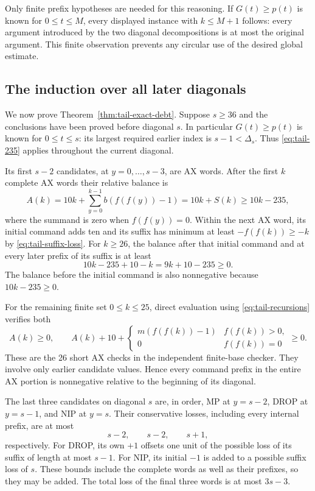 Only finite prefix hypotheses are needed for this reasoning. If
$G(t)\geq p(t)$ is known for $0\leq t\leq M$, every displayed instance
with $k\leq M+1$ follows: every argument introduced by the two diagonal
decompositions is at most the original argument. This finite observation
prevents any circular use of the desired global estimate.

\subsection{The induction over all later diagonals}

We now prove Theorem~\ref{thm:tail-exact-debt}. Suppose $s\geq36$ and
the conclusions have been proved before diagonal $s$.
In particular $G(t)\geq p(t)$ is known for $0\leq t\leq s$:
its largest required earlier index is $s-1<\Delta_s$.
Thus \eqref{eq:tail-235} applies throughout the current diagonal.

Its first $s-2$ candidates, at $y=0,\ldots,s-3$, are AX words.
After the first $k$ complete AX words their relative balance is
\begin{equation}
 A(k)=10k+\sum_{y=0}^{k-1}b(f(f(y))-1)
     =10k+S(k)\geq10k-235,
 \label{eq:tail-AX-complete}
\end{equation}
where the summand is zero when $f(f(y))=0$.
Within the next AX word, its initial command adds ten and its suffix
has minimum at least $-f(f(k))\geq-k$ by
\eqref{eq:tail-suffix-loss}. For $k\geq26$, the balance after that
initial command and at every later prefix of its suffix is at least
\[
 10k-235+10-k=9k+10-235\geq0.
\]
The balance before the initial command is also nonnegative because
$10k-235\geq0$.

For the remaining finite set $0\leq k\leq25$, direct evaluation using
\eqref{eq:tail-recursions} verifies both
\begin{equation}
 A(k)\geq0,\qquad
 A(k)+10+
 \begin{cases}
   m(f(f(k))-1)&f(f(k))>0,\\
   0&f(f(k))=0
 \end{cases}
 \geq0.
 \label{eq:tail-short-AX}
\end{equation}
These are the 26 short AX checks in the independent finite-base
checker. They involve only earlier candidate values. Hence every
command prefix in the entire AX portion is nonnegative relative to
the beginning of its diagonal.

The last three candidates on diagonal $s$ are, in order,
MP at $y=s-2$, DROP at $y=s-1$, and NIP at $y=s$.
Their conservative losses, including every internal prefix, are at most
\[
 s-2,\qquad s-2,\qquad s+1,
\]
respectively. For DROP, its own $+1$ offsets one unit of the possible
loss of its suffix of length at most $s-1$. For NIP, its initial
$-1$ is added to a possible suffix loss of $s$. These bounds include
the complete words as well as their prefixes, so they may be added.
The total loss of the final three words is at most $3s-3$.

